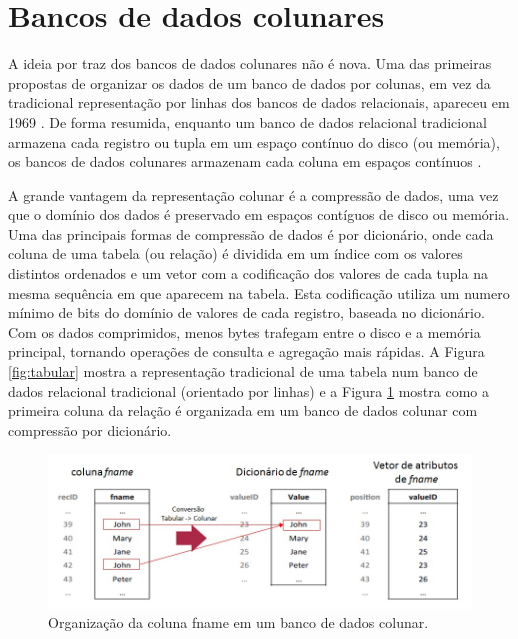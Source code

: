 \section{Bancos de dados colunares} 
\label{sec:colunar}

A ideia por traz dos bancos de dados colunares não é nova. Uma das primeiras propostas de organizar os 
dados de um banco de dados por colunas, em vez da tradicional representação por linhas dos bancos de 
dados relacionais, apareceu em 1969 \citep{estabrook1969theory}. De forma resumida, enquanto um banco de 
dados relacional tradicional armazena cada registro ou tupla em um espaço contínuo do disco (ou memória), 
os bancos de dados colunares armazenam cada coluna em espaços contínuos \citep{Abadi2009}. 

A grande vantagem da representação colunar é a compressão de dados, uma vez que o domínio dos dados 
é preservado em espaços contíguos de disco ou memória. 
Uma das principais formas de compressão de dados é por dicionário, onde cada coluna de uma 
tabela (ou relação) é dividida em um índice com os valores distintos ordenados e um vetor com a 
codificação dos valores de cada tupla na mesma sequência em que aparecem na tabela. 
Esta codificação utiliza um numero mínimo de bits do domínio de valores de cada registro, 
baseada no dicionário. Com os dados comprimidos, menos bytes trafegam entre o disco e a 
memória principal, tornando operações de consulta e agregação mais rápidas.
A Figura \ref{fig:tabular} mostra a representação tradicional de uma tabela num banco de dados 
relacional tradicional (orientado por linhas) e a Figura \ref{fig:colunar} mostra como a 
primeira coluna da relação é organizada em um banco de dados colunar com compressão por dicionário.

\begin{figure}[!htbp]
	\centering
	\includegraphics[width=\linewidth]{./Representacao_colunar.jpg}
	\caption{Organização da coluna fname em um banco de dados colunar.}
	\label{fig:colunar}
\end{figure}


